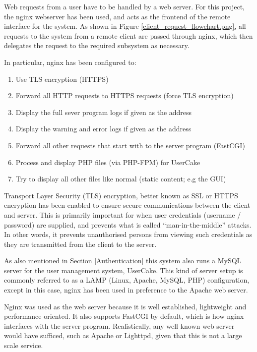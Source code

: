 Web requests from a user have to be handled by a web server. For this project, the nginx\cite{nginx} webserver has been used, and acts as the frontend of the remote interface for the system. As shown in Figure \ref{client_request_flowchart.png}, all requests to the system from a remote client are passed through nginx, which then delegates the request to the required subsystem as necessary. 

In particular, nginx has been configured to:
\begin{enumerate}
	\item Use TLS encryption (HTTPS)
	\item Forward all HTTP requests to HTTPS requests (force TLS encryption)
	\item Display the full sever program logs if given  as the address
	\item Display the warning and error logs if given  as the address
	\item Forward all other requests that start with \api{} to the server program (FastCGI)
	\item Process and display PHP files (via PHP-FPM) for UserCake
	\item Try to display all other files like normal (static content; e.g the GUI)
\end{enumerate}

Transport Layer Security (TLS) encryption, better known as SSL or HTTPS encryption has been enabled to ensure secure communications between the client and server. This is primarily important for when user credentials (username / password) are supplied, and prevents what is called ``man-in-the-middle'' attacks. In other words, it prevents unauthorised persons from viewing such credentials as they are transmitted from the client to the server. 

As also mentioned in Section \ref{Authentication} this system also runs a MySQL server for the user management system, UserCake. This kind of server setup is commonly referred to as a LAMP (Linux, Apache, MySQL, PHP) configuration\cite{}, except in this case, nginx has been used in preference to the Apache web server. 

Nginx was used as the web server because it is well established, lightweight and performance oriented. It also supports FastCGI by default, which is how nginx interfaces with the server program. Realistically, any well known web server would have sufficed, such as Apache or Lighttpd, given that this is not a large scale service.

